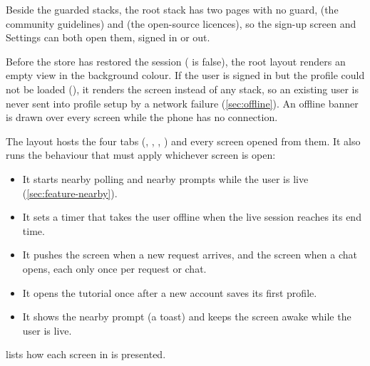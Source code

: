 Beside the guarded stacks, the root stack has two pages with no guard,  (the community
guidelines) and  (the open-source licences), so the sign-up screen and Settings can
both open them, signed in or out.

Before the store has restored the session ( is false), the root layout renders an empty
view in the background colour. If the user is signed in but the profile could not be loaded
(), it renders the  screen instead of any stack, so an existing user
is never sent into profile setup by a network failure (\cref{sec:offline}). An offline banner is drawn
over every screen while the phone has no connection.

The  layout hosts the four tabs (, , , ) and every
screen opened from them. It also runs the behaviour that must apply whichever screen is open:

\begin{itemize}
  \item It starts nearby polling and nearby prompts while the user is live (\cref{sec:feature-nearby}).
  \item It sets a timer that takes the user offline when the live session reaches its end time.
  \item It pushes the  screen when a new request arrives, and the  screen when a
    chat opens, each only once per request or chat.
  \item It opens the tutorial once after a new account saves its first profile.
  \item It shows the nearby prompt (a toast) and keeps the screen awake while the user is live.
\end{itemize}

 lists how each screen in  is presented.


